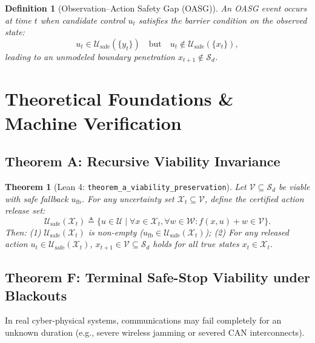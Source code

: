 \documentclass[conference]{IEEEtran}
\newtheorem{theorem}{Theorem}
\newtheorem{definition}{Definition}
\begin{document}
\begin{definition}[Observation--Action Safety Gap (OASG)]
An OASG event occurs at time $t$ when candidate control $u_t$ satisfies the barrier condition on the observed state:
\begin{equation}
u_t \in \mathcal{U}_{\mathrm{safe}}(\{y_t\}) \quad \text{but} \quad u_t \notin \mathcal{U}_{\mathrm{safe}}(\{x_t\}),
\end{equation}
leading to an unmodeled boundary penetration $x_{t+1} \notin \mathcal{S}_d$.
\end{definition}

\section{Theoretical Foundations \& Machine Verification}

\subsection{Theorem A: Recursive Viability Invariance}
\begin{theorem}[Lean 4: \texttt{theorem\_a\_\allowbreak viability\_\allowbreak preservation}]
Let $\mathcal{V} \subseteq \mathcal{S}_d$ be viable with safe fallback $u_{\mathrm{fb}}$. For any uncertainty set $\mathcal{X}_t \subseteq \mathcal{V}$, define the certified action release set:
\begin{equation}
\mathcal{U}_{\mathrm{safe}}(\mathcal{X}_t) \triangleq \{ u \in \mathcal{U} \mid \forall x \in \mathcal{X}_t, \forall w \in \mathcal{W}: f(x, u) + w \in \mathcal{V} \}.
\end{equation}
Then:
(1) $\mathcal{U}_{\mathrm{safe}}(\mathcal{X}_t)$ is non-empty ($u_{\mathrm{fb}} \in \mathcal{U}_{\mathrm{safe}}(\mathcal{X}_t)$);
(2) For any released action $u_t \in \mathcal{U}_{\mathrm{safe}}(\mathcal{X}_t)$, $x_{t+1} \in \mathcal{V} \subseteq \mathcal{S}_d$ holds for all true states $x_t \in \mathcal{X}_t$.
\end{theorem}

\subsection{Theorem F: Terminal Safe-Stop Viability under Blackouts}
In real cyber-physical systems, communications may fail completely for an unknown duration (e.g., severe wireless jamming or severed CAN interconnects). 
\end{document}
